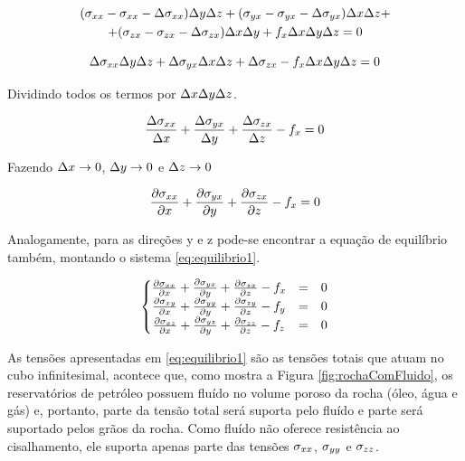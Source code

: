 \begin{multline} \label{eq:equilibrio0}
   (\stxx - \stxx - \Delta \stxx) \Dy\Dz + (\styx - \styx - \Delta \styx)\Dx\Dz  +\\
   + (\stzx - \stzx - \Delta\stzx) \Dx\Dy + f_x\Dx\Dy\Dz = 0
\end{multline}


\begin{equation}
 \Delta \stxx \Dy\Dz + \Delta \styx\Dx\Dz + \Delta\stzx - f_x\Dx\Dy\Dz = 0
\end{equation}

Dividindo todos os termos por $\Dx\Dy\Dz$.


\begin{equation}
\frac{ \Delta \stxx }{ \Dx } + \frac{\Delta \styx}{ \Dy } + \frac{\Delta\stzx}{ \Dz } - f_x = 0
\end{equation}

Fazendo $\Dx \rightarrow 0$, $\Dy \rightarrow 0 $ e $\Dz \rightarrow 0$

\begin{equation}
\dx[\stxx] + \dy[\styx] + \dz[\stzx] - f_x = 0
\end{equation}

Analogamente, para as direções y e z pode-se encontrar a equação de equilíbrio também, montando o sistema \eqref{eq:equilibrio1}.

\begin{equation}
\label{eq:equilibrio1}
\left\{\begin{matrix}
 \dx[\stxx] + \dy[\styx] + \dz[\stzx] - f_x & = & 0\\
 \dx[\stxy] + \dy[\styy] + \dz[\stzy] - f_y & = & 0\\
 \dx[\stxz] + \dy[\styz] + \dz[\stzz] - f_z & = & 0
\end{matrix}\right.
\end{equation}


As tensões apresentadas em \eqref{eq:equilibrio1} são as tensões totais que atuam no cubo infinitesimal, acontece que, como mostra a Figura \ref{fig:rochaComFluido}, os reservatórios de petróleo possuem fluído no volume poroso da rocha (óleo, água e gás) e, portanto, parte da tensão total será suporta pelo fluído e parte será suportado pelos grãos da rocha. Como fluído não oferece resistência ao cisalhamento, ele suporta apenas parte das tensões $\stxx$, $\styy$ e $\stzz$.

